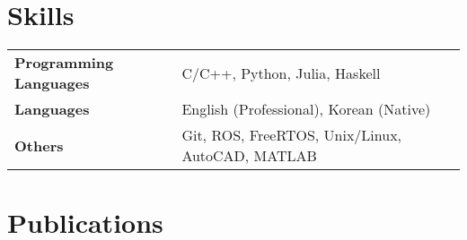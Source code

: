 \documentclass[letterpaper,9pt]{article}
\begin{document}

{\selectfont
\section{Skills}
}
\vspace{-2.5mm}
\begin{tabularx}{\linewidth}{@{}l X@{}}
\textbf{Programming Languages} &  \normalsize{C/C++, Python, Julia, Haskell}\\
\textbf{Languages}  &  \normalsize{English (Professional), Korean (Native)}\\
\textbf{Others}  &  \normalsize{Git, ROS, FreeRTOS, Unix/Linux, AutoCAD, MATLAB}\\
\end{tabularx}

{\selectfont
\section{Publications}
}
\vspace{-2mm}
\begin{refsection}
\nocite{*}
\printbibliography[heading=none]
\end{refsection}

\vfill
{}
\end{document}
